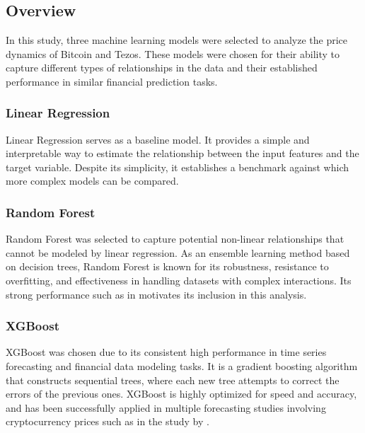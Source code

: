 \chapter{}
\label{ch:machinelearningmodels}

\section{Overview}
\label{sec:overview}

In this study, three machine learning models were selected to analyze the price dynamics of Bitcoin and Tezos. These models were chosen for their ability to capture different types of relationships in the data and their established performance in similar financial prediction tasks.

\subsection{Linear Regression}
Linear Regression serves as a baseline model. It provides a simple and interpretable way to estimate the relationship between the input features and the target variable.
 Despite its simplicity, it establishes a benchmark against which more complex models can be compared.

\subsection{Random Forest}
Random Forest was selected to capture potential non-linear relationships that cannot be modeled by linear regression.
 As an ensemble learning method based on decision trees, Random Forest is known for its robustness, resistance to overfitting, and effectiveness in handling datasets with complex interactions. Its strong performance such as in \textcite{akyildirim2021prediction} motivates its inclusion in this analysis.

\subsection{XGBoost}
XGBoost was chosen due to its consistent high performance in time series forecasting and financial data modeling tasks.
 It is a gradient boosting algorithm that constructs sequential trees, where each new tree attempts to correct the errors of the previous ones. 
 XGBoost is highly optimized for speed and accuracy, and has been successfully applied in multiple forecasting studies involving cryptocurrency prices such as in the study by \textcite{lauraalessandretti2018anticipating}.

